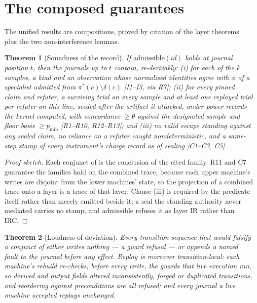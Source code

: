 \documentclass[11pt,a4paper]{article}
\theoremstyle{plain}
\newtheorem{theorem}{Theorem}
\theoremstyle{definition}
\theoremstyle{remark}
\newcommand{\adm}{\ensuremath{\mathrm{admissible}}}
\begin{document}
\section{The composed guarantees}
\label{sec:composed}

The unified results are compositions, proved by citation of the layer theorems plus the two non-interference lemmas.

\begin{theorem}[Soundness of the record]
\label{thm:sound}
If $\adm(\mathit{id})$ holds at journal position $t$, then the journals up to $t$ contain, re-derivably: (i) for each of the $k$ samples, a bind and an observation whose normalised identities agree with $\phi$ of a specialist admitted from $\pi^{*}(c)\setminus\delta(c)$ [I1--I3, via R7]; (ii) for every pinned claim and refuter, a surviving trial on every sample and at least one replayed trial per refuter on this line, seeded after the artifact it attacked, under power records the kernel computed, with concordance $\ge \theta$ against the designated sample and floor basis $\ge p_{\min}$ [R1--R10, R12--R13]; and (iii) no valid escape standing against any sealed claim, no reliance on a refuter caught nondeterministic, and a same-step stamp of every instrument's charge record as of sealing [C1--C3, C5].
\end{theorem}

\begin{proof}[Proof sketch]
Each conjunct of  is the conclusion of the cited family. R11 and C7 guarantee the families hold on the combined trace, because each upper machine's writes are disjoint from the lower machines' state, so the projection of a combined trace onto a layer is a trace of that layer. Clause (iii) is required by the predicate itself rather than merely emitted beside it: a seal the standing authority never mediated carries no stamp, and $\adm$ refuses it as layer IR rather than IRC.
\end{proof}

\begin{theorem}[Loudness of deviation]
\label{thm:loud}
Every transition sequence that would falsify a conjunct of  either writes nothing --- a guard refusal --- or appends a named fault to the journal before any effect. Replay is moreover \emph{transition-local}: each machine's rebuild re-checks, before every write, the guards that live execution ran, so derived and output fields altered inconsistently, forged or duplicated transitions, and reordering against preconditions are all refused; and every journal a live machine accepted replays unchanged.
\end{theorem}
\end{document}

